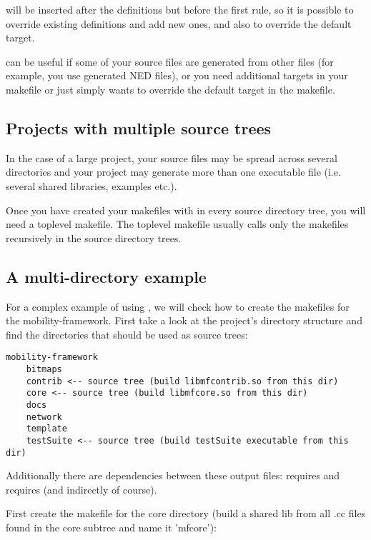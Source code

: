  will be inserted after the definitions but before the first
rule, so it is possible to override existing definitions and add new
ones, and also to override the default target.

 can be useful if some of your source files are generated
from other files (for example, you use generated NED files), or you need
additional targets in your makefile or just simply wants to override the 
default target in the makefile.


\subsection{Projects with multiple source trees}

In the case of a large project, your source files may be spread across
several directories and your project may generate more than one executable
file (i.e. several shared libraries, examples etc.).

Once you have created your makefiles with  in
every source directory tree, you will need a toplevel makefile.
The toplevel makefile usually calls only the makefiles
recursively in the source directory trees.


\subsection{A multi-directory example}

For a complex example of using , we will check how to create
the makefiles for the mobility-framework. First take a look at the
project's directory structure and find the directories that should be used as
source trees:

\begin{verbatim}
mobility-framework
    bitmaps
    contrib <-- source tree (build libmfcontrib.so from this dir)
    core <-- source tree (build libmfcore.so from this dir)
    docs
    network
    template
    testSuite <-- source tree (build testSuite executable from this dir)
\end{verbatim}

Additionally there are dependencies between these output files: 
requires  and  requires  (and indirectly
 of course).

First create the makefile for the core directory (build a shared lib from all .cc files
found in the core subtree and name it 'mfcore'):

